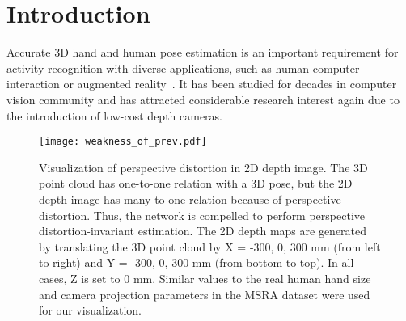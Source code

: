 \documentclass[10pt,twocolumn,letterpaper]{article}
\begin{document}
\section{Introduction}

Accurate 3D hand and human pose estimation is an important requirement for activity recognition with diverse applications, such as human-computer interaction or augmented reality~\cite{romero2009monocular}. It has been studied for decades in computer vision community and has attracted considerable research interest again due to the introduction of low-cost depth cameras.

\begin{figure}[t]
\begin{center}
   \texttt{[image: weakness\_of\_prev.pdf]}
\end{center}
\vspace*{-5mm}
   \caption{Visualization of perspective distortion in 2D depth image. The 3D point cloud has one-to-one relation with a 3D pose, but the 2D depth image has many-to-one relation because of perspective distortion. Thus, the network is compelled to perform perspective distortion-invariant estimation. The 2D depth maps are generated by translating the 3D point cloud by X = -300, 0, 300 mm (from left to right) and Y = -300, 0, 300 mm (from bottom to top). In all cases, Z is set to 0 mm. Similar values to the real human hand size and camera projection parameters in the MSRA dataset were used for our visualization.}
\vspace*{-3mm}
\label{fig:weakness_of_prev}
\end{figure}
\end{document}
